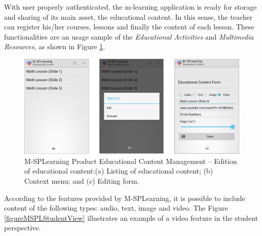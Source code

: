With user properly authenticated, the m-learning application is ready for storage and sharing of its main asset, the educational content. In this sense, the teacher can register his/her courses, lessons and finally the content of each lesson. These functionalities are an usage sample of the \textit{Educational Activities} and \textit{Multimedia Resources}, as shown in Figure \ref{figureMSPLEducationalContent}.

\begin{figure}[!ht]
\centering
\includegraphics[scale=0.325]{figures/section3/MSPLEducationalContent}
\caption{M-SPLearning Product Educational Content Management -- Edition of educational content:\newline(a) Listing of educational content; (b) Context menu; and (c) Editing form.}
\label{figureMSPLEducationalContent}
\end{figure}

According to the features provided by M-SPLearning, it is possible to include content of the following types: audio, text, image and video. %
The Figure \ref{figureMSPLStudentView} illustrates an example of a video feature in the student perspective.

